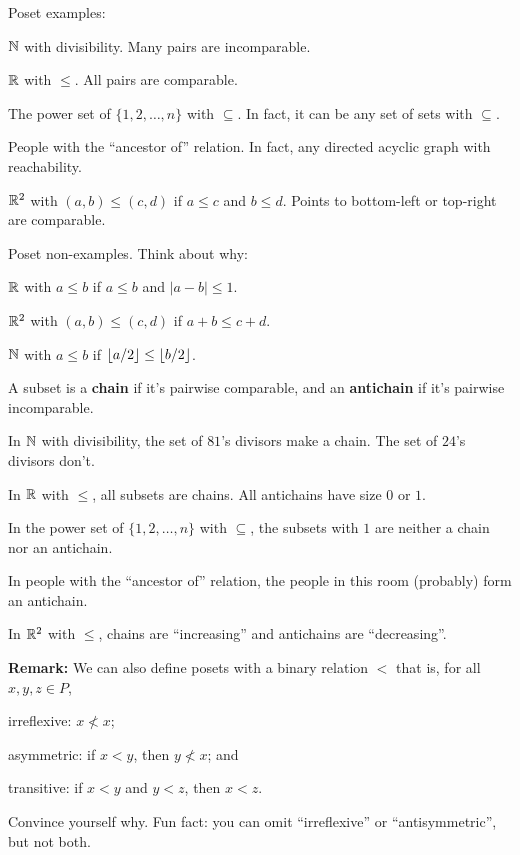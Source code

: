 \documentclass[11pt,paper=letter]{scrartcl}
\begin{document}
\vspace{1em}
\noindent
Poset examples:
\begin{itemthin}
\item $\mathbb N$ with divisibility. Many pairs are incomparable.
\item $\mathbb R$ with $\le$. All pairs are comparable.
\item The power set of $\{1, 2, \ldots, n\}$ with $\subseteq$. In fact, it can be any set of sets with $\subseteq$.
\item People with the ``ancestor of'' relation. In fact, any directed acyclic graph with reachability.
\item $\mathbb R^2$ with $(a, b) \le (c, d)$ if $a \le c$ and $b \le d$. Points to bottom-left or top-right are comparable.
\end{itemthin}
Poset non-examples. Think about why:
\begin{itemthin}
\item $\mathbb R$ with $a \le b$ if $a \le b$ and $|a - b| \le 1$.
\item $\mathbb R^2$ with $(a, b) \le (c, d)$ if $a + b \le c + d$.
\item $\mathbb N$ with $a \le b$ if $\left\lfloor a/2 \right\rfloor \le \left\lfloor b/2 \right\rfloor$.
\end{itemthin}
\vspace{1em}
\noindent
A subset is a \textbf{chain} if it's pairwise comparable, and an \textbf{antichain} if it's pairwise incomparable.
\begin{itemthin}
\item In $\mathbb N$ with divisibility, the set of $81$'s divisors make a chain. The set of $24$'s divisors don't.
\item In $\mathbb R$ with $\le$, all subsets are chains. All antichains have size $0$ or $1$.
\item In the power set of $\{1, 2, \ldots, n\}$ with $\subseteq$, the subsets with $1$ are neither a chain nor an antichain.
\item In people with the ``ancestor of'' relation, the people in this room (probably) form an antichain.
\item In $\mathbb R^2$ with $\le$, chains are ``increasing'' and antichains are ``decreasing''.
\end{itemthin}
\vspace{1em}
\noindent
\textbf{Remark:} We can also define posets with a binary relation $<$ that is, for all $x, y, z \in P$,
\begin{itemthin}
\item irreflexive: $x \not< x$;
\item asymmetric: if $x < y$, then $y \not< x$; and
\item transitive: if $x < y$ and $y < z$, then $x < z$.
\end{itemthin}
Convince yourself why. Fun fact: you can omit ``irreflexive'' or ``antisymmetric'', but not both.
\end{document}
